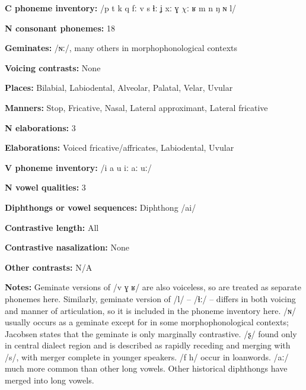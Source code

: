 \textbf{C phoneme inventory:} /p t k q fː v s ɬː ʝ xː ɣ $\chi ː$ ʁ m n ŋ ɴ l/



\textbf{N consonant phonemes:} 18



\textbf{Geminates:} /ɴː/, many others in morphophonological contexts



\textbf{Voicing contrasts:} None



\textbf{Places:} Bilabial, Labiodental, Alveolar, Palatal, Velar, Uvular



\textbf{Manners:} Stop, Fricative, Nasal, Lateral approximant, Lateral fricative 



\textbf{N elaborations:} 3



\textbf{Elaborations:} Voiced fricative/affricates, Labiodental, Uvular



\textbf{V phoneme inventory:} /i a u iː aː uː/



\textbf{N vowel qualities:} 3



\textbf{Diphthongs or vowel sequences:} Diphthong /ai/



\textbf{Contrastive length:} All



\textbf{Contrastive nasalization:} None



\textbf{Other contrasts:} N/A



\textbf{Notes:} Geminate versions of /v ɣ ʁ/ are also voiceless, so are treated as separate phonemes here. Similarly, geminate version of /l/ -- /ɬː/ -- differs in both voicing and manner of articulation, so it is included in the phoneme inventory here. /ɴ/ usually occurs as a geminate except for in some morphophonological contexts; Jacobsen states that the geminate is only marginally contrastive. /ʂ/ found only in central dialect region and is described as rapidly receding and merging with /s/, with merger complete in younger speakers. /f h/ occur in loanwords. /aː/ much more common than other long vowels. Other historical diphthongs have merged into long vowels.



